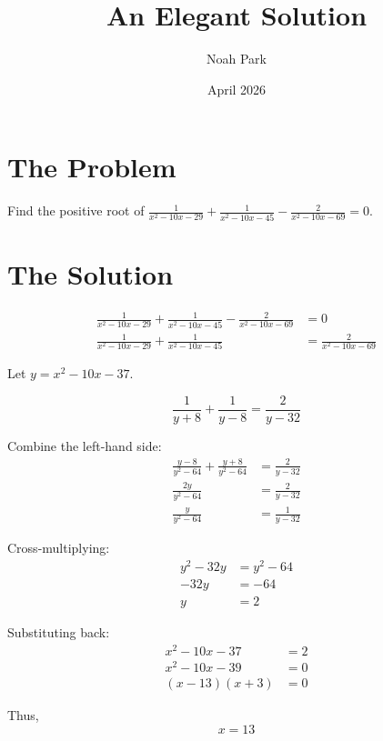 \documentclass{article}
\title{An Elegant Solution}
\author{Noah Park}
\date{April 2026}
\theoremstyle{definition}
\begin{document}
\maketitle

\section{The Problem}

Find the positive root of $\frac {1}{x^2-10x-29} + \frac{1}{x^2-10x-45} - \frac {2}{x^2-10x-69} = 0$. 

\section{The Solution}
\begin{align*}
\frac {1}{x^2-10x-29} + \frac{1}{x^2-10x-45} - \frac {2}{x^2-10x-69} &= 0\\
\frac {1}{x^2-10x-29} + \frac{1}{x^2-10x-45} &=  \frac {2}{x^2-10x-69}
\end{align*}


Let $y = x^2-10x-37$.

\[
\frac {1}{y+8} + \frac{1}{y-8} =  \frac {2}{y-32}
\]

Combine the left-hand side:
\begin{align*}
\frac {y-8}{y^2-64} + \frac{y+8}{y^2-64} &=  \frac {2}{y-32}\\
\frac {2y}{y^2-64} &=  \frac {2}{y-32} \\
\frac {y}{y^2-64} &=  \frac {1}{y-32}
\end{align*}

Cross-multiplying:
\begin{align*}
y^2-32y&=y^2-64 \\
-32y&=-64 \\
y&=2
\end{align*}

Substituting back:
\begin{align*}
x^2-10x-37&=2\\
x^2-10x-39&=0\\
(x-13)(x+3)&=0
\end{align*}

Thus,
\[
x= \boxed{13}
\]
\end{document}
